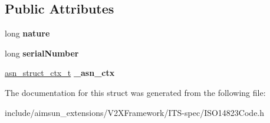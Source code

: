 \subsection*{Public Attributes}
\begin{DoxyCompactItemize}
\item 
long {\bfseries nature}\hypertarget{structISO14823Code_1_1ISO14823Code____pictogramCode_1_1ISO14823Code____pictogramCode____pictogramCategoryCode_a89ef51ef3c54227d4b9c0402274fba2f}{}\label{structISO14823Code_1_1ISO14823Code____pictogramCode_1_1ISO14823Code____pictogramCode____pictogramCategoryCode_a89ef51ef3c54227d4b9c0402274fba2f}

\item 
long {\bfseries serial\+Number}\hypertarget{structISO14823Code_1_1ISO14823Code____pictogramCode_1_1ISO14823Code____pictogramCode____pictogramCategoryCode_a58c831302c148fd0369a031259d4ce85}{}\label{structISO14823Code_1_1ISO14823Code____pictogramCode_1_1ISO14823Code____pictogramCode____pictogramCategoryCode_a58c831302c148fd0369a031259d4ce85}

\item 
\hyperlink{structasn__struct__ctx__s}{asn\+\_\+struct\+\_\+ctx\+\_\+t} {\bfseries \+\_\+asn\+\_\+ctx}\hypertarget{structISO14823Code_1_1ISO14823Code____pictogramCode_1_1ISO14823Code____pictogramCode____pictogramCategoryCode_a9be23ab5c136a07772fe9f684ef5e177}{}\label{structISO14823Code_1_1ISO14823Code____pictogramCode_1_1ISO14823Code____pictogramCode____pictogramCategoryCode_a9be23ab5c136a07772fe9f684ef5e177}

\end{DoxyCompactItemize}


The documentation for this struct was generated from the following file\+:\begin{DoxyCompactItemize}
\item 
include/aimsun\+\_\+extensions/\+V2\+X\+Framework/\+I\+T\+S-\/spec/I\+S\+O14823\+Code.\+h\end{DoxyCompactItemize}
